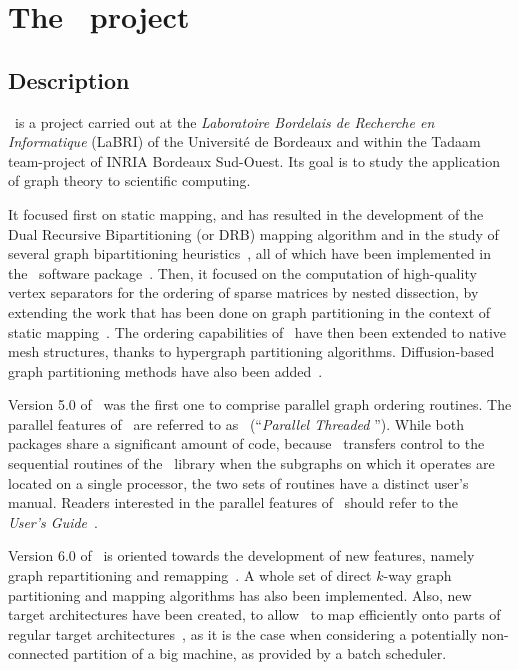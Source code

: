 \section{The \scotch\ project}
\label{sec-project}

\subsection{Description}

\scotch\ is a project carried out at the \textit{Laboratoire Bordelais de
Recherche en Informatique\/} (LaBRI) of the Universit\'e de Bordeaux and
within the Tadaam team-project of INRIA Bordeaux Sud-Ouest. Its goal
is to study the application of graph theory to scientific computing.

It focused first on static mapping, and has resulted in the
development of the Dual Recursive Bipartitioning (or DRB) mapping
algorithm and in the study of several graph bipartitioning
heuristics~\cite{pell94a}, all of which have been implemented in the
\scotch\ software package~\cite{pero96a}. Then, it focused on the
computation of high-quality vertex separators for the ordering of
sparse matrices by nested dissection, by extending the work that has
been done on graph partitioning in the context of static
mapping~\cite{pero97a,peroam99}. The ordering
capabilities of \scotch\ have then been extended to native mesh structures,
thanks to hypergraph partitioning algorithms. Diffusion-based graph
partitioning methods have also been added~\cite{chpe06a,pell07b}.

Version \textsc{5.0} of \scotch\ was the first one to comprise parallel
graph ordering routines. The parallel features of \scotch\ are referred
to as \ptscotch\ (``\emph{Parallel Threaded \scotch}''). While both
packages share a significant amount of code, because
\ptscotch\ transfers control to the sequential routines of the
\libscotch\ library when the subgraphs on which it operates are
located on a single processor, the two sets of routines have a
distinct user's manual. Readers interested in the parallel features
of \scotch\ should refer to the \emph{\ptscotch\ \textsc{\scotchver}
User's Guide}~\scotchcitepuser.

Version \textsc{6.0} of \scotch\ is oriented towards the development of
new features, namely graph repartitioning and
remapping~\cite{fope11a}. A whole set of direct $k$-way graph
partitioning and mapping algorithms has also been implemented.
Also, new target architectures have been created, to allow \scotch\ to
map efficiently onto parts of regular target
architectures~\cite{pellegrini:hal-01671156}, as it is the case when
considering a potentially non-connected partition of a big machine, as
provided by a batch scheduler.

